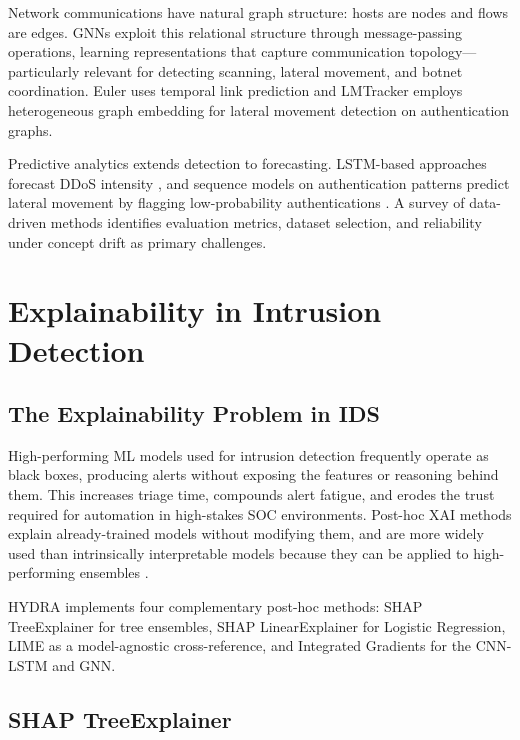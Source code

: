 \documentclass[12pt,a4paper]{report}
\begin{document}
Network communications have natural graph structure: hosts are nodes and flows are edges. GNNs exploit this relational structure through message-passing operations, learning representations that capture communication topology---particularly relevant for detecting scanning, lateral movement, and botnet coordination. Euler \cite{king2023} uses temporal link prediction and LMTracker \cite{fangY2022} employs heterogeneous graph embedding for lateral movement detection on authentication graphs.

Predictive analytics extends detection to forecasting. LSTM-based approaches forecast DDoS intensity \cite{kong2025}, and sequence models on authentication patterns predict lateral movement by flagging low-probability authentications \cite{turcotte2018}. A survey of data-driven methods \cite{chou2021} identifies evaluation metrics, dataset selection, and reliability under concept drift as primary challenges.

\section{Explainability in Intrusion Detection}
\label{sec:xai}

\subsection{The Explainability Problem in IDS}
\label{sec:xai-problem}

High-performing ML models used for intrusion detection frequently operate as black boxes, producing alerts without exposing the features or reasoning behind them. This increases triage time, compounds alert fatigue, and erodes the trust required for automation in high-stakes SOC environments. Post-hoc XAI methods explain already-trained models without modifying them, and are more widely used than intrinsically interpretable models because they can be applied to high-performing ensembles \cite{adadi2018}.

HYDRA implements four complementary post-hoc methods: SHAP TreeExplainer for tree ensembles, SHAP LinearExplainer for Logistic Regression, LIME as a model-agnostic cross-reference, and Integrated Gradients for the CNN-LSTM and GNN.

\subsection{SHAP TreeExplainer}
\label{sec:shap-tree}
\end{document}
